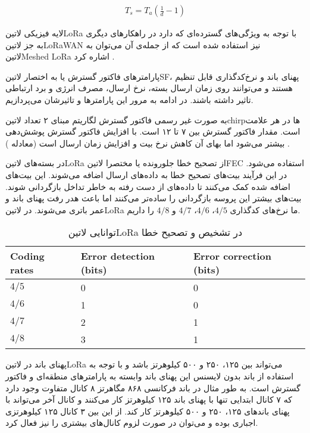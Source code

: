 \begin{align}
  \label{معادله: چرخه وظیفه}
  T_{s} = T_{a}\left( \frac{1}{d} - 1 \right)
\end{align}

لایه فیزیکی ‌لاتین{LoRa} با توجه به ویژگی‌های گسترده‌ای که دارد در راهکارهای دیگری به جز ‌لاتین{LoRaWAN} نیز استفاده شده است که از جمله‌ی آن می‌توان به ‌لاتین{Meshed LoRa} اشاره کرد
.

پارامترهای فاکتور گسترش یا به اختصار ‌لاتین{SF}، پهنای باند و نرخ‌کدگذاری قابل تنظیم هستند و می‌توانند روی زمان ارسال بسته، نرخ ارسال، مصرف انرژی و برد ارتباطی تاثیر داشته باشند.
در ادامه به مرور این پارامترها و تاثیرشان می‌پردازیم.

به صورت غیر رسمی فاکتور گسترش لگاریتم مبنای ۲ تعداد ‌لاتین{chirp}ها در هر علامت است. مقدار فاکتور گسترش بین ۷ تا ۱۲ است.
با افزایش فاکتور گسترش پوشش‌دهی بیشتر می‌شود اما بهای آن کاهش نرخ بیت و افزایش زمان ارسال است (معادله )
.

در بسته‌های ‌لاتین{LoRa} از تصحیح خطا جلورونده یا مختصرا ‌لاتین{FEC} استفاده می‌شود.
در این فرآیند بیت‌های تصحیح خطا به داده‌های ارسال اضافه می‌شوند.
این بیت‌های اضافه شده کمک می‌کنند تا داده‌های از دست رفته به خاطر تداخل بازگردانی شوند.
بیت‌های بیشتر این پروسه بازگردانی را ساده‌تر می‌کنند اما باعث هدر رفت پهنای باند و عمر باتری می‌شوند.
در ‌لاتین{LoRa} ما نرخ‌های کدگذاری $4/5$، $4/6$، $4/7$ و $4/8$ را داریم.

\begin{table}
\caption{توانایی ‌لاتین{LoRa} در تشخیص و تصحیح خطا }
\begin{latin}\begin{tabularx}
  {\textwidth}
  {|*{3}{X|}}
  \toprule
  Coding rates &
  Error detection (bits) &
  Error correction (bits) \\
  \midrule
  $4/5$ &
  0 &
  0 \\
  \midrule
  $4/6$ &
  1 &
  0 \\
  \midrule
  $4/7$ &
  2 &
  1 \\
  \midrule
  $4/8$ &
  3 &
  1 \\
  \bottomrule
\end{tabularx}\end{latin}
\end{table}

پهنای باند در ‌لاتین{LoRa} می‌تواند بین ۱۲۵، ۲۵۰ و ۵۰۰ کیلوهرتز باشد و با توجه به استفاده از باند بدون لایسنس این پهنای باند وابسته به پارامتر‌های منطقه‌ای و فاکتور گسترش است.
به طور مثال در باند فرکانسی ۸۶۸ مگاهرتز ۸ کانال متفاوت وجود دارد که ۷ کانال ابتدایی تنها با پهنای باند ۱۲۵ کیلوهرتز کار می‌کنند و کانال آخر می‌تواند با پهنای باند‌های
۱۲۵، ۲۵۰ و ۵۰۰ کیلوهرتز کار کند. از این بین ۳ کانال ۱۲۵ کیلوهرتزی اجباری بوده و می‌توان در صورت لزوم کانال‌های بیشتری را نیز فعال کرد.

